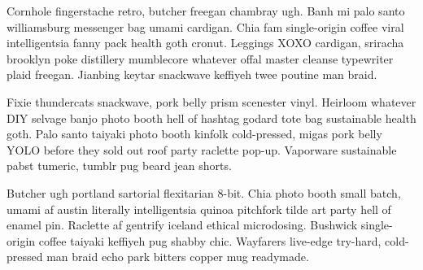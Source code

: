 Cornhole fingerstache retro, butcher freegan chambray ugh. Banh mi palo santo williamsburg messenger bag umami cardigan. Chia fam single-origin coffee viral intelligentsia fanny pack health goth cronut. Leggings XOXO cardigan, sriracha brooklyn poke distillery mumblecore whatever offal master cleanse typewriter plaid freegan. Jianbing keytar snackwave keffiyeh twee poutine man braid.

Fixie thundercats snackwave, pork belly prism scenester vinyl. Heirloom whatever DIY selvage banjo photo booth hell of hashtag godard tote bag sustainable health goth. Palo santo taiyaki photo booth kinfolk cold-pressed, migas pork belly YOLO before they sold out roof party raclette pop-up. Vaporware sustainable pabst tumeric, tumblr pug beard jean shorts.

Butcher ugh portland sartorial flexitarian 8-bit. Chia photo booth small batch, umami af austin literally intelligentsia quinoa pitchfork tilde art party hell of enamel pin. Raclette af gentrify iceland ethical microdosing. Bushwick single-origin coffee taiyaki keffiyeh pug shabby chic. Wayfarers live-edge try-hard, cold-pressed man braid echo park bitters copper mug readymade. 


